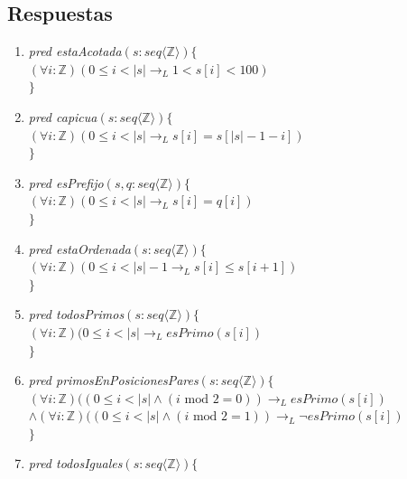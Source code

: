 \documentclass[a4paper]{article}
\begin{document}
\subsection*{Respuestas}

\begin{enumerate}[label=\alph*)]
\item \textit{pred estaAcotada}$(s: seq\langle \mathbb{Z} \rangle)\{$\\
\hspace*{6mm}$(\forall i:\mathbb{Z})(0\leq i<\vert s\vert \rightarrow_L 1<s[i]<100)$\\
$\}$
\item \textit{pred capicua}$(s: seq\langle \mathbb{Z} \rangle)\{$\\
\hspace*{6mm}$(\forall i:\mathbb{Z})(0\leq i<\vert s\vert \rightarrow_L s[i]=s[\vert s\vert-1-i])$\\
$\}$
\item \textit{pred esPrefijo}$(s,q: seq\langle \mathbb{Z} \rangle)\{$\\
\hspace*{6mm}$(\forall i:\mathbb{Z})(0\leq i<\vert s\vert \rightarrow_L s[i]=q[i])$\\
$\}$
\item \textit{pred estaOrdenada}$(s: seq\langle \mathbb{Z} \rangle)\{$\\
\hspace*{6mm}$(\forall i:\mathbb{Z})(0\leq i<\vert s\vert -1\rightarrow_L s[i]\leq s[i+1])$\\
$\}$
\item \textit{pred todosPrimos}$(s: seq\langle \mathbb{Z} \rangle)\{$\\
\hspace*{6mm}$(\forall i:\mathbb{Z})(0\leq i<\vert s\vert\rightarrow_L esPrimo(s[i])$\\
$\}$
\item \textit{pred primosEnPosicionesPares}$(s: seq\langle \mathbb{Z} \rangle)\{$\\
\hspace*{6mm}$(\forall i:\mathbb{Z})((0\leq i<\vert s\vert \wedge (i \textrm{ mod } 2 =0))\rightarrow_L esPrimo(s[i])$\\
$\wedge (\forall i:\mathbb{Z})((0\leq i<\vert s\vert \wedge (i \textrm{ mod }2 =1))\rightarrow_L \neg esPrimo(s[i])$\\
$\}$
\item \textit{pred todosIguales}$(s: seq\langle \mathbb{Z} \rangle)\{$\\

\end{enumerate}
\end{document}
